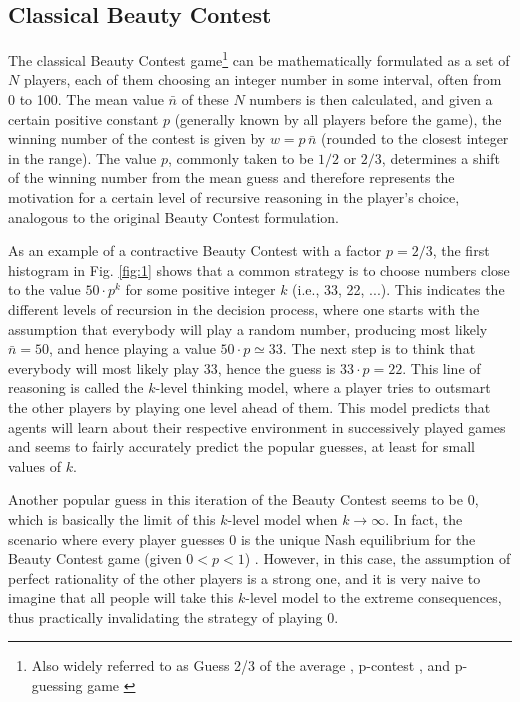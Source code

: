 \subsection{Classical Beauty Contest}

The classical Beauty Contest game\footnote{Also widely referred to as Guess 2/3 of the average \citep{ledoux1981concours}, p-contest \citep{kennerberg2019convergence}, and p-guessing game \citep{vie2021evolutionary}} can be mathematically formulated as a set of $N$ players, each of them choosing an integer number in some interval, often from 0 to 100. The mean value $\bar{n}$ of these $N$ numbers is then calculated, and given a certain positive constant $p$ (generally known by all players before the game), the winning number of the contest is given by $w=p\,\bar{n}$ (rounded to the closest integer in the range). The value $p$, commonly taken to be $1/2$ or $2/3$, determines a shift of the winning number from the mean guess and therefore represents the motivation for a certain level of recursive reasoning in the player's choice, analogous to the original Beauty Contest formulation.

As an example of a contractive Beauty Contest with a factor $p=2/3$, the first histogram in Fig. \ref{fig:1} shows that a common strategy is to choose numbers close to the value $50\cdot p^k$ for some positive integer $k$ (i.e., 33, 22, ...). This indicates the different levels of recursion in the decision process, where one starts with the assumption that everybody will play a random number, producing most likely $\bar{n}=50$, and hence playing a value $50\cdot p\simeq 33$. The next step is to think that everybody will most likely play $33$, hence the guess is $33\cdot p=22$. This line of reasoning is called the $k$-level thinking model, where a player tries to outsmart the other players by playing one level ahead of them. This model predicts that agents will learn about their respective environment in successively played games and seems to fairly accurately predict the popular guesses, at least for small values of $k$.

Another popular guess in this iteration of the Beauty Contest seems to be 0, which is basically the limit of this $k$-level model when $k\to\infty$. In fact, the scenario where every player guesses 0 is the unique Nash equilibrium for the Beauty Contest game (given $0<p<1$) \citep{kennerberg2019convergence}. However, in this case, the assumption of perfect rationality of the other players is a strong one, and it is very naive to imagine that all people will take this $k$-level model to the extreme consequences, thus practically invalidating the strategy of playing 0.

